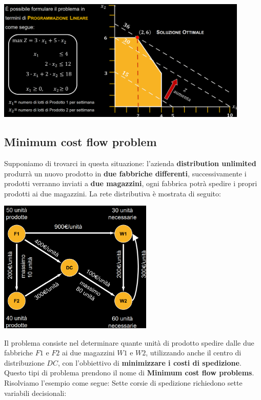 \documentclass[12pt]{article}
\begin{document}
\begin{center}
    \includegraphics[width = 0.90\textwidth]{Images/16.png}
\end{center}
\subsection{Minimum cost flow problem}
Supponiamo di trovarci in questa situazione:
l'azienda \textbf{distribution unlimited} produrrà un nuovo prodotto in \textbf{due fabbriche differenti},
successivamente i prodotti verranno inviati a \textbf{due magazzini}, ogni fabbrica potrà spedire i propri prodotti ai due magazzini.
La rete distributiva è mostrata di seguito:
\begin{center}
    \includegraphics[width = 0.55\textwidth]{Images/17.png}
\end{center}
Il problema consiste nel determinare quante unità di prodotto spedire dalle due fabbriche \textbf{$F1$} e \textbf{$F2$} ai due magazzini
\textbf{$W1$} e \textbf{$W2$}, utilizzando anche il centro di distribuzione \textbf{$DC$}, con l'obbiettivo di \textbf{minimizzare i costi di spedizione}. \newline
Questo tipi di problema prendono il nome di \textbf{Minimum cost flow problems}. Risolviamo l'esempio come segue: \newline
Sette corsie di spedizione richiedono sette variabili decisionali:
\end{document}
